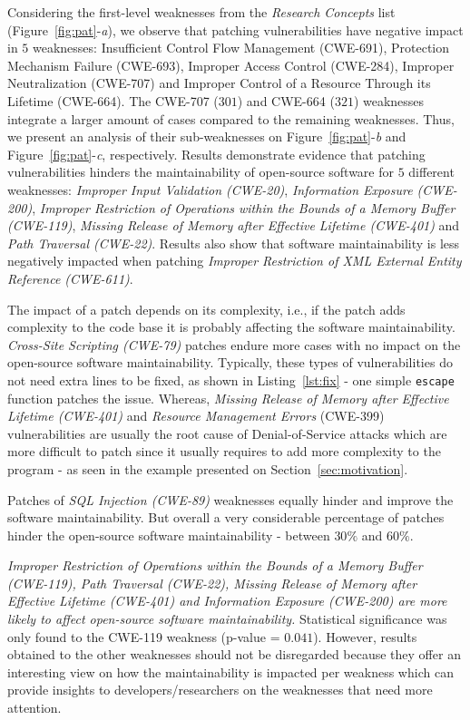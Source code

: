 \documentclass[10pt,conference]{IEEEtran}
\begin{document}
Considering the first-level weaknesses from the \emph{Research Concepts}
list (Figure~\ref{fig:pat}-\emph{a}), we observe that patching vulnerabilities
have negative impact in $5$ weaknesses: Insufficient Control Flow Management 
(CWE-691), Protection Mechanism Failure (CWE-693), Improper Access Control 
(CWE-284), Improper Neutralization (CWE-707) and Improper Control of a Resource 
Through its Lifetime (CWE-664). The CWE-707 ($301$) and CWE-664 ($321$) 
weaknesses integrate a larger amount of cases compared to the remaining 
weaknesses. Thus, we present an analysis of their sub-weaknesses on 
Figure~\ref{fig:pat}-\emph{b} and Figure~\ref{fig:pat}-\emph{c}, respectively. 
Results demonstrate evidence that patching vulnerabilities hinders 
the maintainability of open-source software for $5$ different weaknesses: 
\emph{Improper Input Validation (CWE-20)}, \emph{Information Exposure 
(CWE-200)}, \emph{Improper Restriction of Operations within the Bounds of 
a Memory Buffer (CWE-119)}, \emph{Missing Release of Memory after Effective 
Lifetime (CWE-401)} and \emph{Path Traversal (CWE-22)}. Results also show that 
software maintainability is less negatively impacted when patching 
\emph{Improper Restriction of XML External Entity Reference (CWE-611)}.  

The impact of a patch depends on its complexity, i.e., if the patch
adds complexity to the code base it is probably affecting the software
maintainability. \emph{Cross-Site Scripting (CWE-79)} patches endure more
cases with no impact on the open-source software maintainability.
Typically, these types of vulnerabilities do not need extra lines 
to be fixed, as shown in Listing~\ref{lst:fix} - one simple \texttt{escape} 
function patches the issue. Whereas, \emph{Missing Release of Memory after Effective 
Lifetime (CWE-401)} and \emph{Resource Management Errors} (CWE-399) vulnerabilities
are usually the root cause of Denial-of-Service attacks which are more difficult
to patch since it usually requires to add more complexity to the program - as
seen in the example presented on Section~\ref{sec:motivation}. 




Patches of \emph{SQL Injection
(CWE-89)} weaknesses equally hinder and improve the software maintainability. 
But overall a very considerable percentage of patches hinder the open-source 
software maintainability - between $30\%$ and $60\%$. 

\textit{Improper Restriction of Operations within the Bounds of 
a Memory Buffer (CWE-119), Path Traversal (CWE-22), Missing Release of Memory after Effective 
Lifetime (CWE-401) and \emph{Information Exposure 
(CWE-200)} are more likely to affect open-source software maintainability.}
Statistical significance was only found to the CWE-119 weakness (p-value = 
$0.041$). However, results obtained to the other weaknesses should not be 
disregarded because they offer an interesting view on how the maintainability 
is impacted per weakness which can provide insights to developers/researchers
on the weaknesses that need more attention.
\end{document}
